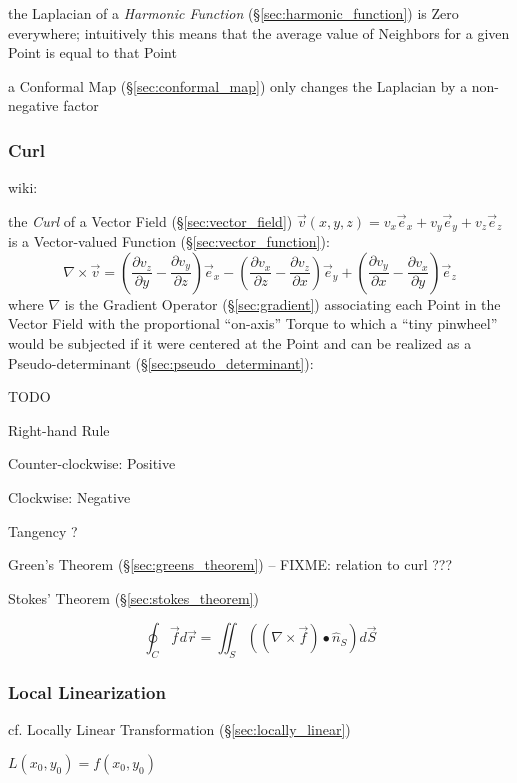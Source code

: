 the Laplacian of a \emph{Harmonic Function} (\S\ref{sec:harmonic_function}) is
Zero everywhere; intuitively this means that the average value of Neighbors for
a given Point is equal to that Point

a Conformal Map (\S\ref{sec:conformal_map}) only changes the Laplacian by a
non-negative factor



\subsubsection{Curl}\label{sec:curl}

wiki:

the \emph{Curl} of a Vector Field (\S\ref{sec:vector_field}) $\vec{v}(x,y,z) =
v_x\vec{e}_x + v_y\vec{e}_y + v_z\vec{e}_z$ is a Vector-valued Function
(\S\ref{sec:vector_function}):
\[
  \nabla\times\vec{v} =
    (\frac{\partial v_z}{\partial y}-\frac{\partial v_y}{\partial z})\vec{e}_x -
    (\frac{\partial v_x}{\partial z}-\frac{\partial v_z}{\partial x})\vec{e}_y +
    (\frac{\partial v_y}{\partial x}-\frac{\partial v_x}{\partial y})\vec{e}_z
\]
where $\nabla$ is the Gradient Operator (\S\ref{sec:gradient}) associating each
Point in the Vector Field with the proportional ``on-axis'' Torque to which a
``tiny pinwheel'' would be subjected if it were centered at the Point and can
be realized as a Pseudo-determinant (\S\ref{sec:pseudo_determinant}):

TODO

Right-hand Rule

Counter-clockwise: Positive

Clockwise: Negative

Tangency ?

Green's Theorem (\S\ref{sec:greens_theorem}) -- FIXME: relation to curl ???

Stokes' Theorem (\S\ref{sec:stokes_theorem})

\[
  \oint_C \vec{f} d\vec{r}
    = \iint_S ((\nabla \times \vec{f}) \bullet \hat{n}_S) d\vec{S}
\]



\subsubsection{Local Linearization}\label{sec:local_linearization}

\fist cf. Locally Linear Transformation (\S\ref{sec:locally_linear})

$L(x_0,y_0) = f(x_0,y_0)$

